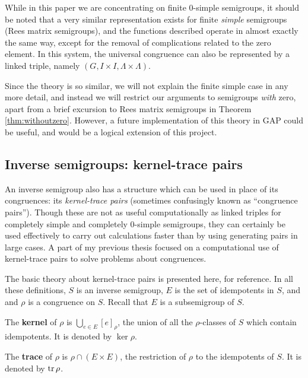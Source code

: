 While in this paper we are concentrating on finite 0-simple semigroups, it
should be noted that a very similar representation exists for finite
\emph{simple} semigroups (Rees matrix semigroups), and the functions described
operate in almost exactly the same way, except for the removal of complications
related to the zero element.  In this system, the universal congruence can also
be represented by a linked triple, namely $(G, I \times I, \Lambda \times
\Lambda)$. \cite[p.90-91]{howie}

Since the theory is so similar, we will not explain the finite simple case
in any more detail, and instead we will restrict our arguments to semigroups
\emph{with} zero, apart from a brief excursion to Rees matrix semigroups in
Theorem \ref{thm:withoutzero}.  However, a future implementation of this theory
in GAP could be useful, and would be a logical extension of this project.

\subsection{Inverse semigroups: kernel-trace pairs}
\label{sec:kertr}

An inverse semigroup also has a structure which can be used in place of its
congruences: its \textit{kernel-trace pairs} (sometimes confusingly known as
``congruence pairs'').  Though these are not as useful computationally as linked
triples for completely simple and completely 0-simple semigroups, they can
certainly be used effectively to carry out calculations faster than by using
generating pairs in large cases.  A part of my previous thesis \cite[Chapter
5]{mtorpey_msc} focused on a computational use of kernel-trace pairs to solve
problems about congruences.

The basic theory about kernel-trace pairs is presented here, for reference.  In
all these definitions, $S$ is an inverse semigroup, $E$ is the set of
idempotents in $S$, and and $\rho$ is a congruence on $S$.  Recall that $E$ is a
subsemigroup of $S$.

\begin{definition}
  \label{def:kernel}
  The \textbf{kernel} of $\rho$ is $\bigcup_{e \in E} [e]_\rho$, the union of
  all the $\rho$-classes of $S$ which contain idempotents.  It is denoted by
  $\ker\rho$.\cite[p.155]{howie}
\end{definition}

\begin{definition}
  \label{def:trace}
  The \textbf{trace} of $\rho$ is $\rho \cap (E \times E)$, the restriction of
  $\rho$ to the idempotents of $S$.  It is denoted by $\operatorname{tr}\rho$.
  \cite[p.155]{howie}
\end{definition}

